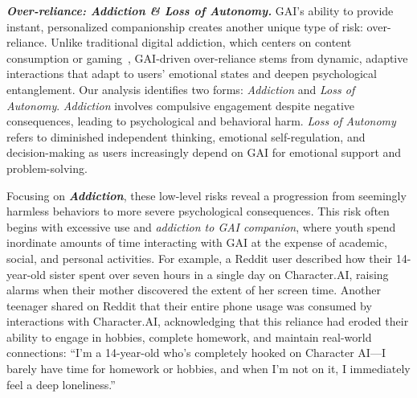 \textbf{\textit{Over-reliance: Addiction \& Loss of Autonomy.}}
GAI’s ability to provide instant, personalized companionship creates another unique type of risk: over-reliance. Unlike traditional digital addiction, which centers on content consumption or gaming~\cite{huang2022meta}, GAI-driven over-reliance stems from dynamic, adaptive interactions that adapt to users' emotional states and deepen psychological entanglement. Our analysis identifies two forms: \textit{Addiction} and \textit{Loss of Autonomy}. \textit{Addiction} involves compulsive engagement despite negative consequences, leading to psychological and behavioral harm. \textit{Loss of Autonomy} refers to diminished independent thinking, emotional self-regulation, and decision-making as users increasingly depend on GAI for emotional support and problem-solving.

Focusing on \textbf{\textit{Addiction}}, these low-level risks reveal a progression from seemingly harmless behaviors to more severe psychological consequences. This risk often begins with excessive use and \textit{addiction to GAI companion}, where youth spend inordinate amounts of time interacting with GAI at the expense of academic, social, and personal activities. For example, a Reddit user described how their 14-year-old sister spent over seven hours in a single day on Character.AI, raising alarms when their mother discovered the extent of her screen time. Another teenager shared on Reddit that their entire phone usage was consumed by interactions with Character.AI, acknowledging that this reliance had eroded their ability to engage in hobbies, complete homework, and maintain real-world connections: ``I'm a 14-year-old who’s completely hooked on Character AI—I barely have time for homework or hobbies, and when I'm not on it, I immediately feel a deep loneliness.'' 

